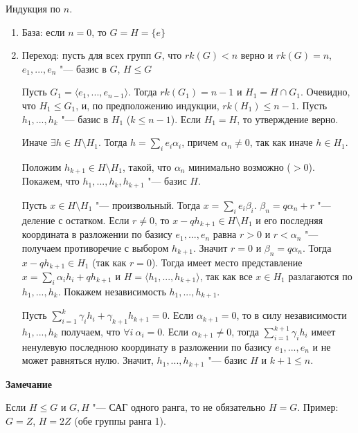 \documentclass{article}
\begin{document}
Индукция по $n$.
\begin{enumerate}
	\item База: если $n = 0$, то $G = H = \{e\}$
	\item Переход: пусть для всех групп $G$, что $rk(G) < n$ верно и $rk(G) = n$, $e_1, ..., e_n$ "--- базис в $G$, $H \leq G$
	
	Пусть $G_1 = \langle e_1, ..., e_{n-1} \rangle$. Тогда $rk(G_1) = n - 1$ и $H_1 = H \cap G_1$. Очевидно, что $H_1 \leq G_1$, и, по предположению индукции, $rk(H_1) \leq n - 1$. Пусть $h_1, ..., h_k$ "--- базис в $H_1$ ($k \leq n-1$). Если $H_1 = H$, то утверждение верно.
	
	Иначе $\exists h \in H \setminus H_1$. Тогда $h = \sum \limits_i e_i\alpha_i$, причем $\alpha_n \neq 0$, так как иначе $h \in H_1$.
	
	Положим $h_{k+1} \in H \setminus H_1$, такой, что $\alpha_n$ минимально возможно ($> 0$). Покажем, что $h_1, ..., h_k, h_{k+1}$ "--- базис $H$.
	
	Пусть $x \in H \setminus H_1$ "--- произвольный. Тогда $x = \sum \limits_i e_i\beta_i$. $\beta_n = q\alpha_n + r$ "--- деление с остатком. Если $r \neq 0$, то $x - qh_{k+1} \in H \setminus H_1$ и его последняя координата в разложении по базису $e_1, ..., e_n$ равна $r > 0$ и $r < \alpha_n$ "--- получаем противоречие с выбором $h_{k+1}$. Значит $r = 0$ и $\beta_n = q\alpha_n$. Тогда $x - qh_{k+1} \in H_1$ (так как $r = 0$). Тогда имеет место представление $x = \sum \limits_i\alpha_ih_i + qh_{k+1}$ и $H = \langle h_1, ..., h_{k+1} \rangle$, так как все $x \in H_1$ разлагаются по $h_1, ..., h_k$. Покажем независимость $h_1, ..., h_{k+1}$.
	
Пусть $\sum_{i = 1}^k\gamma_ih_i + \gamma_{k+1}h_{k+1} = 0$. Если $\alpha_{k+1} = 0$, то в силу независимости $h_1, ..., h_k$ получаем, что $\forall i \  \alpha_i = 0$. Если $\alpha_{k+1} \neq 0$, тогда $\sum_{i = 1}^{k+1}\gamma_ih_i$ имеет ненулевую последнюю координату в разложении по базису $e_1, ..., e_n$ и не может равняться нулю. Значит, $h_1, ..., h_{k+1}$ "--- базис $H$ и $k+1 \leq n$.

\end{enumerate}

\vspace{10pt}

\textbf{Замечание}

Если $H \leq G$ и $G, H$ "--- САГ одного ранга, то не обязательно $H = G$. Пример: $G = Z$, $H = 2Z$ (обе группы ранга 1).

\vspace{5pt}
\end{document}
